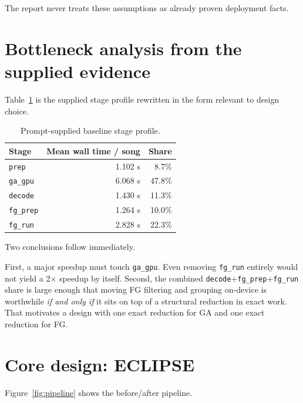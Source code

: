 \documentclass[11pt]{article}
\newcommand{\method}{ECLIPSE}
\begin{document}
The report never treats these assumptions as already proven deployment facts.

\section{Bottleneck analysis from the supplied evidence}

Table~\ref{tab:baseline-profile} is the supplied stage profile rewritten in the form relevant to design choice.

\begin{table}[H]
\centering
\caption{Prompt-supplied baseline stage profile.}
\label{tab:baseline-profile}
\small
\begin{tabular}{lrr}
\toprule
\textbf{Stage} & \textbf{Mean wall time / song} & \textbf{Share} \\
\midrule
\texttt{prep} & 1.102 s & 8.7\% \\
\texttt{ga\_gpu} & 6.068 s & 47.8\% \\
\texttt{decode} & 1.430 s & 11.3\% \\
\texttt{fg\_prep} & 1.264 s & 10.0\% \\
\texttt{fg\_run} & 2.828 s & 22.3\% \\
\bottomrule
\end{tabular}
\end{table}

Two conclusions follow immediately.

First, a major speedup must touch \texttt{ga\_gpu}. Even removing \texttt{fg\_run} entirely would not yield a 2$\times$ speedup by itself. Second, the combined \texttt{decode}+\texttt{fg\_prep}+\texttt{fg\_run} share is large enough that moving FG filtering and grouping on-device is worthwhile \emph{if and only if} it sits on top of a structural reduction in exact work. That motivates a design with one exact reduction for GA and one exact reduction for FG.

\section{Core design: \method}

Figure~\ref{fig:pipeline} shows the before/after pipeline.
\end{document}
